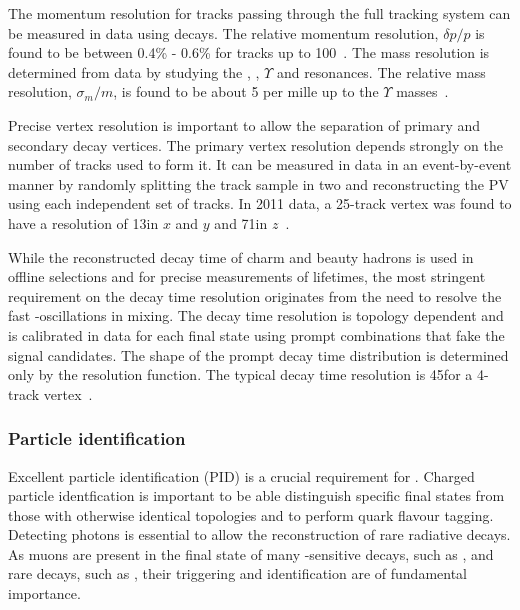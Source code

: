 The momentum resolution for tracks passing through the full tracking system can be measured in data using \decay{\jpsi}{\mumu} decays. The relative momentum resolution, $\delta p/p$ is found to be between 0.4\% - 0.6\% for tracks up to 100\gevc~\cite{LHCb-DP-2014-002}. The mass resolution is determined from data by studying the \jpsi, \psitwos, $\Upsilon$ and \Z resonances. The relative mass resolution, $\sigma_{m}/m$, is found to be about 5 per mille up to the $\Upsilon$ masses~\cite{LHCb-DP-2014-002}.

Precise vertex resolution is important to allow the separation of primary and secondary decay vertices. The primary vertex resolution depends strongly on the number of tracks used to form it. It can be measured in data in an event-by-event manner by randomly splitting the track sample in two and reconstructing the PV using each independent set of tracks. In 2011 data, a 25-track vertex was found to have a resolution of 13\mum in $x$ and $y$ and 71\mum in $z$~\cite{LHCb-DP-2014-002}.
 
While the reconstructed decay time of charm and beauty hadrons is used in offline selections and for precise measurements of lifetimes, the most stringent requirement on the decay time resolution originates from the need to resolve the fast \Bs-\Bsb oscillations in mixing. The decay time resolution is topology dependent and is calibrated in data for each final state using prompt combinations that fake the signal candidates. The shape of the prompt decay time distribution is determined only by the resolution function. The typical decay time resolution is 45\fs for a 4-track vertex~\cite{LHCb-DP-2014-002}.

\subsubsection{Particle identification}
\label{sec:lhcb:pid}

Excellent particle identification (PID) is a crucial requirement for \lhcb. Charged particle identfication is important to be able distinguish specific final states from those with otherwise identical topologies and to perform \bquark quark flavour tagging. Detecting photons is essential to allow the reconstruction of rare radiative decays. As muons are present in the final state of many \CP-sensitive decays, such as \BsToJPsiPhi, and rare decays, such as \BsToMuMu, their triggering and identification are of fundamental importance.

